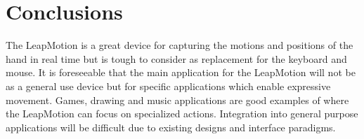 \section{Conclusions}
The LeapMotion is a great device for capturing the motions and positions of the hand in real time but is tough to consider as replacement for the keyboard and mouse. It is foreseeable that the main application for the LeapMotion will not be as a general use device but for specific applications which enable expressive movement. Games, drawing and music applications are good examples of where the LeapMotion can focus on specialized actions. Integration into general purpose applications will be difficult due to existing designs and interface paradigms. 






